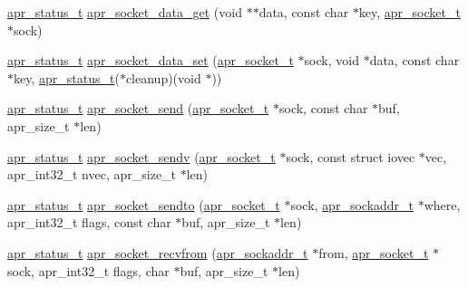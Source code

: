 \begin{DoxyCompactItemize}
\item 
\hyperlink{group__apr__errno_gaf76ee4543247e9fb3f3546203e590a6c}{apr\+\_\+status\+\_\+t} \hyperlink{group__apr__network__io_gae76b48d0224a608b4ddb8bd00582eaa7}{apr\+\_\+socket\+\_\+data\+\_\+get} (void $\ast$$\ast$data, const char $\ast$key, \hyperlink{group__apr__network__io_ga49262b223e7434746e1f1737659aa2c3}{apr\+\_\+socket\+\_\+t} $\ast$sock)
\item 
\hyperlink{group__apr__errno_gaf76ee4543247e9fb3f3546203e590a6c}{apr\+\_\+status\+\_\+t} \hyperlink{group__apr__network__io_gafec197f3aa9a495801cdf7892ff8dcb5}{apr\+\_\+socket\+\_\+data\+\_\+set} (\hyperlink{group__apr__network__io_ga49262b223e7434746e1f1737659aa2c3}{apr\+\_\+socket\+\_\+t} $\ast$sock, void $\ast$data, const char $\ast$key, \hyperlink{group__apr__errno_gaf76ee4543247e9fb3f3546203e590a6c}{apr\+\_\+status\+\_\+t}($\ast$cleanup)(void $\ast$))
\item 
\hyperlink{group__apr__errno_gaf76ee4543247e9fb3f3546203e590a6c}{apr\+\_\+status\+\_\+t} \hyperlink{group__apr__network__io_ga943268245cf59f6ff8cf1458c9a9ba8d}{apr\+\_\+socket\+\_\+send} (\hyperlink{group__apr__network__io_ga49262b223e7434746e1f1737659aa2c3}{apr\+\_\+socket\+\_\+t} $\ast$sock, const char $\ast$buf, apr\+\_\+size\+\_\+t $\ast$len)
\item 
\hyperlink{group__apr__errno_gaf76ee4543247e9fb3f3546203e590a6c}{apr\+\_\+status\+\_\+t} \hyperlink{group__apr__network__io_ga99ece70c34a7a332daa3941de3950c64}{apr\+\_\+socket\+\_\+sendv} (\hyperlink{group__apr__network__io_ga49262b223e7434746e1f1737659aa2c3}{apr\+\_\+socket\+\_\+t} $\ast$sock, const struct iovec $\ast$vec, apr\+\_\+int32\+\_\+t nvec, apr\+\_\+size\+\_\+t $\ast$len)
\item 
\hyperlink{group__apr__errno_gaf76ee4543247e9fb3f3546203e590a6c}{apr\+\_\+status\+\_\+t} \hyperlink{group__apr__network__io_ga03ae34bc5712dac2b3fdee39e5f87be3}{apr\+\_\+socket\+\_\+sendto} (\hyperlink{group__apr__network__io_ga49262b223e7434746e1f1737659aa2c3}{apr\+\_\+socket\+\_\+t} $\ast$sock, \hyperlink{structapr__sockaddr__t}{apr\+\_\+sockaddr\+\_\+t} $\ast$where, apr\+\_\+int32\+\_\+t flags, const char $\ast$buf, apr\+\_\+size\+\_\+t $\ast$len)
\item 
\hyperlink{group__apr__errno_gaf76ee4543247e9fb3f3546203e590a6c}{apr\+\_\+status\+\_\+t} \hyperlink{group__apr__network__io_ga80880312b41e86c9c266ede1a504e2ca}{apr\+\_\+socket\+\_\+recvfrom} (\hyperlink{structapr__sockaddr__t}{apr\+\_\+sockaddr\+\_\+t} $\ast$from, \hyperlink{group__apr__network__io_ga49262b223e7434746e1f1737659aa2c3}{apr\+\_\+socket\+\_\+t} $\ast$sock, apr\+\_\+int32\+\_\+t flags, char $\ast$buf, apr\+\_\+size\+\_\+t $\ast$len)
$$
\end{DoxyCompactItemize}

